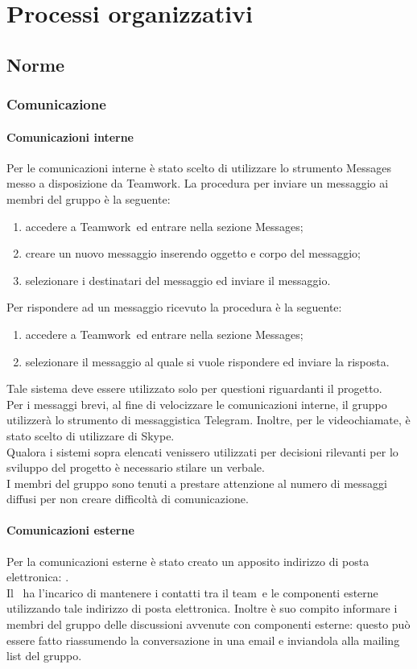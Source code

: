 \documentclass[../NormeProgetto.tex]{subfiles}
\begin{document}
\section{Processi organizzativi}
	\subsection{Norme}
		\subsubsection{Comunicazione}
			\paragraph{Comunicazioni interne}
			Per le comunicazioni interne è stato scelto di utilizzare lo strumento Messages messo a disposizione da Teamwork\g.
			La procedura per inviare un messaggio ai membri del gruppo è la seguente:
			\begin{enumerate}
				\item accedere a Teamwork\g\ ed entrare nella sezione Messages;
				\item creare un nuovo messaggio inserendo oggetto e corpo del messaggio;
				\item selezionare i destinatari del messaggio ed inviare il messaggio.
			\end{enumerate}
			Per rispondere ad un messaggio ricevuto la procedura è la seguente:
			\begin{enumerate}
				\item accedere a Teamwork\g\ ed entrare nella sezione Messages;
				\item selezionare il messaggio al quale si vuole rispondere ed inviare la risposta.
			\end{enumerate}
			 Tale sistema deve essere utilizzato solo per questioni riguardanti il progetto. \\
			Per i messaggi brevi, al fine di velocizzare le comunicazioni interne, il gruppo utilizzerà lo strumento di messaggistica Telegram\g. Inoltre, per le videochiamate, è stato scelto di utilizzare di Skype\g. \\
			Qualora i sistemi sopra elencati venissero utilizzati per decisioni rilevanti per lo sviluppo del progetto è necessario stilare un verbale.\\
			I membri del gruppo sono tenuti a prestare attenzione al numero di messaggi diffusi per non creare difficoltà di comunicazione. 
			\paragraph{Comunicazioni esterne}
			Per la comunicazioni esterne è stato creato un apposito indirizzo di posta elettronica: \mailleaf. \\
			Il \responsabilediprogetto\ ha l'incarico di mantenere i contatti tra il team\g\ e le componenti esterne utilizzando tale indirizzo di posta elettronica. Inoltre è suo compito informare i membri del gruppo delle discussioni avvenute con componenti esterne: questo può essere fatto riassumendo la conversazione in una email e inviandola alla mailing list del gruppo.
\end{document}
